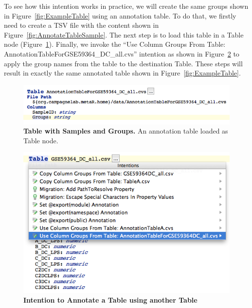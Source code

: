 To see how this intention works in practice, we will create the same groups shown in Figure~\ref{fig:ExampleTable} using an annotation table. To do that, we firstly need to create a TSV file with the content shown in Figure~\ref{fig:AnnotateTableSample}. The next step is to load this table in a Table node (Figure~\ref{fig:NewAnnotationTable}).  Finally, we invoke the ``Use Column Groups From Table: Annotation\allowbreak{}Table\allowbreak{}For\allowbreak{}GSE59364\_DC\_all.cvs'' intention as shown in Figure~\ref{fig:AnnotateTableIntention} to apply the group names from the table to the destination Table. These steps will result in exactly the same annotated table shown in Figure~\ref{fig:ExampleTable}.

 
\begin{figure}[h!tbp]
  \centering
  \includegraphics[width=\figWidthWide]{figures/AnnotationTable.png}
\caption[Table with Samples and Groups]{\textbf{Table with Samples and Groups.} An annotation table loaded as Table node.}
\label{fig:NewAnnotationTable}
\end{figure}


\begin{figure}[h!tbp]
  \centering
  \includegraphics[width=\figWidthWide]{figures/AnnotateTableIntention.png}
\caption[Intention to Annotate a Table using another Table]{\textbf{Intention to Annotate a Table using another Table} }
\label{fig:AnnotateTableIntention}
\end{figure}

